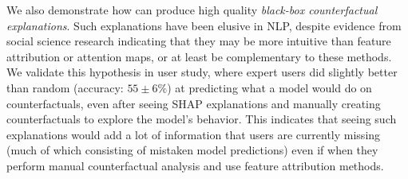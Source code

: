 We also demonstrate how \sysname can produce high quality \emph{black-box counterfactual explanations}. Such explanations have been elusive in NLP, despite evidence from social science research \cite{miller} indicating that they may be more intuitive than feature attribution or attention maps, or at least be complementary to these methods. 
We validate this hypothesis in user study, where expert users did slightly better than random (accuracy: $55 \pm 6\%$) at predicting what a model would do on \sysname counterfactuals, even after seeing SHAP explanations \cite{NIPS2017_7062} and manually creating counterfactuals to explore the model's behavior. This indicates that seeing such explanations would add a lot of information that users are currently missing (much of which consisting of mistaken model predictions) even if when they perform manual counterfactual analysis and use feature attribution methods.


